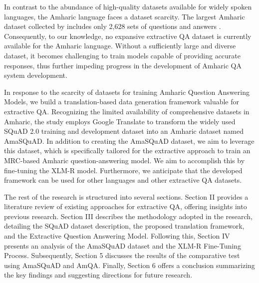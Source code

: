 In contrast to the abundance of high-quality datasets available for widely spoken languages, the Amharic language faces a dataset scarcity. The largest Amharic dataset collected by \cite{abedissa2023amqa} includes only 2,628 sets of questions and answers . Consequently, to our knowledge, no expansive extractive QA dataset is currently available for the Amharic language. Without a sufficiently large and diverse dataset, it becomes challenging to train models capable of providing accurate responses, thus further impeding progress in the development of Amharic QA system development.

In response to the scarcity of datasets for training Amharic Question Answering Models, we build a translation-based data generation framework valuable for extractive QA. Recognizing the limited availability of comprehensive datasets in Amharic, the study employs Google Translate to transform the widely used SQuAD 2.0 training and development dataset into an Amharic dataset named AmaSQuAD. In addition to creating the AmaSQuAD dataset, we aim to leverage this dataset, which is specifically tailored for the extractive approach to train an MRC-based Amharic question-answering model. We aim to accomplish this by fine-tuning the XLM-R model. Furthermore, we anticipate that the developed framework can be used for other languages and other extractive QA datasets.

The rest of the research is structured into several sections. Section II provides a literature review of existing approaches for extractive QA, offering insights into previous research. Section III describes the methodology adopted in the research, detailing the SQuAD dataset description, the proposed translation framework, and the Extractive Question Answering Model. Following this, Section IV presents an analysis of the AmaSQuAD dataset and the XLM-R Fine-Tuning Process. Subsequently, Section 5 discusses the results of the comparative test using AmaSQuAD and AmQA. Finally, Section 6 offers a conclusion summarizing the key findings and suggesting directions for future research.
